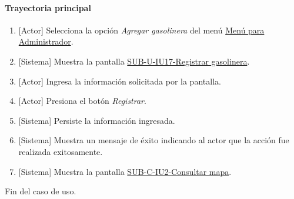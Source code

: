 \paragraph{Trayectoria principal}
	\begin{enumerate}
		\item {[Actor]} Selecciona la opción \textit{Agregar gasolinera} del menú \hyperref[fig:menu-admi]{Menú para Administrador}.
		\item {[Sistema]} Muestra la pantalla \hyperref[fig:sub-u-iu17]{SUB-U-IU17-Registrar gasolinera}.
		\item {[Actor]} Ingresa la información solicitada por la pantalla.
		\item {[Actor]} Presiona el botón \textit{Registrar}.
		\item {[Sistema]} Persiste la información ingresada.
		\item {[Sistema]} Muestra un mensaje de éxito indicando al actor que la acción fue realizada exitosamente.
		\item \label{SUB-U-CU10:Pantalla} {[Sistema]} Muestra la pantalla \hyperref[fig:sub-c-iu2]{SUB-C-IU2-Consultar mapa}.
	\end{enumerate}
	Fin del caso de uso.

